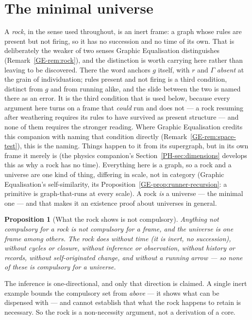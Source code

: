 \documentclass[11pt,a4paper]{article}
\newtheorem{proposition}[definition]{Proposition}
\theoremstyle{remark}\newtheorem{remark}[definition]{Remark}
\begin{document}
\section{The minimal universe}\label{sec:minimal}
A \emph{rock}, in the sense used throughout, is an inert frame: a graph whose rules
are present but not firing, so it has no succession and no time of its own. That is
deliberately the weaker of two senses Graphic Equalisation distinguishes
(Remark~\ref{GE-rem:rock}), and the
distinction is worth carrying here rather than leaving to be discovered. There the
word anchors $g$ itself, with $r$ and $\Gamma$ \emph{absent} at the grain of
individuation; rules present and not firing is a third condition, distinct from $g$
and from running alike, and the slide between the two is named there as an error. It
is the third condition that is used below, because every argument here turns on a
frame that \emph{could} run and does not --- a rock resuming after weathering requires
its rules to have survived as present structure --- and none of them requires the
stronger reading. Where Graphic Equalisation credits this companion with naming that
condition directly (Remark~\ref{GE-rem:space-test}), this is the naming. Things
happen to it from its supergraph, but in its own frame it merely is (the physics
companion's Section~\ref{PH-sec:dimensions} develops this as why a rock has no
time). Everything here is a graph, so a
rock and a universe are one kind of thing, differing in scale, not in category
(Graphic Equalisation's self-similarity, its
Proposition~\ref{GE-prop:runner-recursion}: a primitive is graph-that-runs at every
scale). A rock \emph{is} a universe --- the minimal one --- and that makes it an
existence proof about universes in general.

\begin{proposition}[What the rock shows is not compulsory]\label{prop:minimal-universe}
Anything not compulsory for a rock is not compulsory for a frame, and the universe is one frame among others. The rock does
without time (it is inert, no succession), without cycles or closure, without
inference or observation, without history or records, without self-originated
change, and without a running arrow --- so none of these is compulsory for a
universe.
\end{proposition}

The inference is one-directional, and only that direction is claimed. A single inert example
bounds the compulsory set from \emph{above} --- it shows what can be dispensed with --- and
cannot establish that what the rock happens to retain is necessary. So the rock is a
non-necessity argument, not a derivation of a core.
\end{document}

